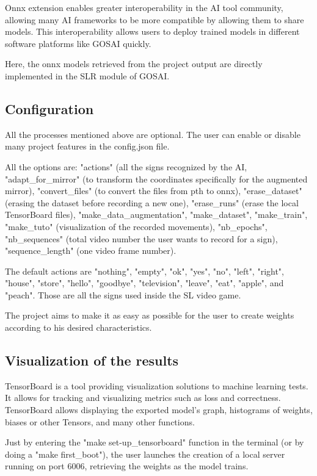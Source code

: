 Onnx extension enables greater interoperability in the AI tool community, allowing many AI frameworks to be more compatible by allowing them to share models. This interoperability allows users to deploy trained models in different software platforms like GOSAI quickly.

Here, the onnx models retrieved from the project output are directly implemented in the SLR module of GOSAI.


\subsection{Configuration}

All the processes mentioned above are optional. The user can enable or disable many project features in the config.json file. 

All the options are: "actions" (all the signs recognized by the AI, "adapt\_for\_mirror" (to transform the coordinates specifically for the augmented mirror), "convert\_files" (to convert the files from pth to onnx), "erase\_dataset" (erasing the dataset before recording a new one), "erase\_runs" (erase the local TensorBoard files), "make\_data\_augmentation", "make\_dataset", "make\_train", "make\_tuto" (visualization of the recorded movements), "nb\_epochs", "nb\_sequences" (total video number the user wants to record for a sign), "sequence\_length" (one video frame number).

The default actions are "nothing", "empty", "ok", "yes", "no", "left", "right", "house", "store", "hello", "goodbye", "television", "leave", "eat", "apple", and "peach". Those are all the signs used inside the SL video game.

The project aims to make it as easy as possible for the user to create weights according to his desired characteristics.

\subsection{Visualization of the results}

TensorBoard is a tool providing visualization solutions to machine learning tests. It allows for tracking and visualizing metrics such as loss and correctness. TensorBoard allows displaying the exported model's graph, histograms of weights, biases or other Tensors, and many other functions.

Just by entering the "make set-up\_tensorboard" function in the terminal (or by doing a "make first\_boot"), the user launches the creation of a local server running on port 6006, retrieving the weights as the model trains. 


